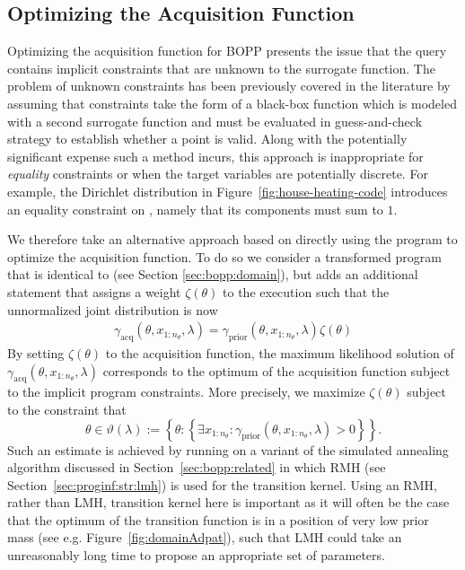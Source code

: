 
\subsection{Optimizing the Acquisition Function}
\label{sec:optacqfunc}

Optimizing the acquisition function for BOPP presents the issue that the query contains implicit constraints that are unknown to the surrogate function.  The problem of unknown constraints has been previously covered in the literature \citep{gardner2014bayesian,gelbart2014bayesian,hernandez2015general} by assuming that constraints take the form of a black-box function which is modeled with a second surrogate function and must be evaluated in guess-and-check strategy to establish whether a point is valid. Along with the potentially significant expense such a method incurs, this approach is inappropriate for \emph{equality} constraints or when the target variables are potentially discrete.  For example, the Dirichlet distribution in Figure~\ref{fig:house-heating-code} introduces an equality constraint on , namely that its components must sum to $1$.

We therefore take an alternative approach based on directly using the program to optimize the acquisition function.  To do so we consider a transformed program  that is identical to  (see Section \ref{sec:bopp:domain}), but adds an additional \observe statement that assigns a weight $\zeta(\theta)$ to the execution such that the unnormalized joint distribution is now 
\begin{align}
\label{eq:bopp:qacq}
\gamma_{\text{acq}}(\theta,x_{1:n_{\theta}},\lambda) = \gamma_{\text{prior}}(\theta,x_{1:n_{\theta}},\lambda) \zeta(\theta)
\end{align}
By setting $\zeta(\theta)$ to the acquisition function, the maximum likelihood solution 
of $\gamma_{\text{acq}}(\theta,x_{1:n_{\theta}},\lambda)$ corresponds to the optimum of the acquisition function 
subject to the implicit program constraints.  More precisely, we maximize $\zeta(\theta)$ subject to
the constraint that
\[
\theta \in \vartheta(\lambda) := \left\{\theta : \left\{\exists x_{1:n_{\theta}} :
 \gamma_{\text{prior}}(\theta,x_{1:n_{\theta}},\lambda)>0\right\} \right\}.
\]
Such an estimate is achieved by running on \qacq a variant of the simulated annealing algorithm 
discussed in Section~\ref{sec:bopp:related} in which RMH (see Section~\ref{sec:proginf:str:lmh}) is used for
the transition kernel.  Using an RMH, rather than LMH, transition kernel here is important as it will often
be the case that the optimum of the transition function is in a position of very low prior mass (see e.g. Figure~\ref{fig:domainAdpat}),
such that LMH could take an unreasonably long time to propose an appropriate set of parameters.

